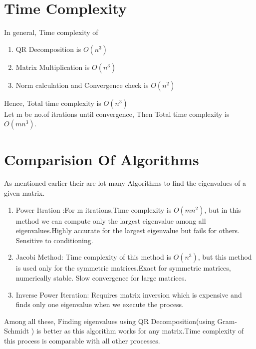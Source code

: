 \documentclass[12pt]{article}
\begin{document}
   
\section{Time Complexity}   
In general, Time complexity of
\begin{enumerate}
\item QR Decomposition is $O(n^3)$
\item Matrix Multiplication is $O(n^3)$
\item Norm calculation and Convergence check  is $O(n^2)$
\end{enumerate}
Hence, Total time complexity is $O(n^3)$ \\
Let m be no.of itrations until convergence, Then Total time complexity is $O(mn^3)$.\\
\section{Comparision Of Algorithms}
As mentioned earlier their are lot many Algorithms to find the eigenvalues of a given matrix.
\begin{enumerate}
\item Power Itration :For m itrations,Time complexity is $O(mn^2)$, but in this method we can compute only the largest eigenvalue among all eigenvalues.Highly accurate for the largest eigenvalue but fails for others. Sensitive to conditioning.
\item Jacobi Method: Time complexity of this method is $O(n^3)$, but this method is used only for the symmetric matrices.Exact for symmetric matrices, numerically stable. Slow convergence for large matrices.
\item Inverse Power Iteration: Requires matrix inversion which is expensive and finds only one eigenvalue when we execute the process. 
\end{enumerate}
Among all these, Finding eigenvalues using QR Decomposition(using Gram-Schmidt ) is better as this algorithm works for any matrix.Time complexity of this process is comparable with all other processes.
\end{document}

